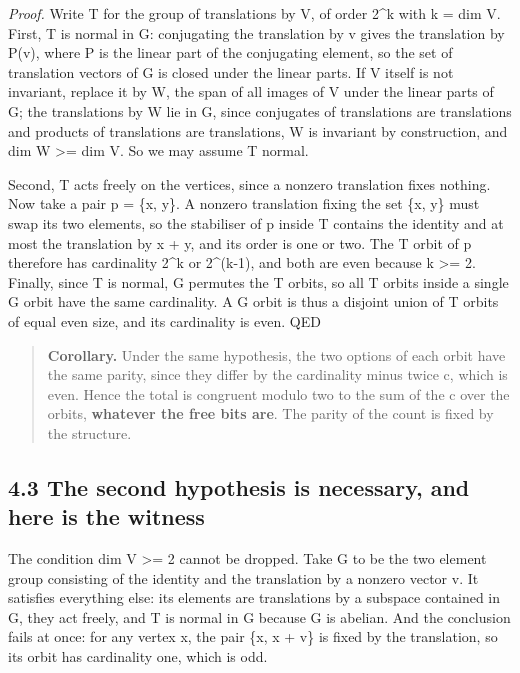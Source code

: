 \documentclass[11pt,a4paper]{article}
\begin{document}
\emph{Proof.} Write T for the group of translations by V, of order 2\textasciicircum{}k with k = dim V. First, T is normal in G: conjugating the translation by v gives the translation by P(v), where P is the linear part of the conjugating element, so the set of translation vectors of G is closed under the linear parts. If V itself is not invariant, replace it by W, the span of all images of V under the linear parts of G; the translations by W lie in G, since conjugates of translations are translations and products of translations are translations, W is invariant by construction, and dim W >= dim V. So we may assume T normal.

Second, T acts freely on the vertices, since a nonzero translation fixes nothing. Now take a pair p = \{x, y\}. A nonzero translation fixing the set \{x, y\} must swap its two elements, so the stabiliser of p inside T contains the identity and at most the translation by x + y, and its order is one or two. The T orbit of p therefore has cardinality 2\textasciicircum{}k or 2\textasciicircum{}(k-1), and both are even because k >= 2. Finally, since T is normal, G permutes the T orbits, so all T orbits inside a single G orbit have the same cardinality. A G orbit is thus a disjoint union of T orbits of equal even size, and its cardinality is even. QED

\begin{quote}
\textbf{Corollary.} Under the same hypothesis, the two options of each orbit have the same parity, since they differ by the cardinality minus twice c, which is even. Hence the total is congruent modulo two to the sum of the c over the orbits, \textbf{whatever the free bits are}. The parity of the count is fixed by the structure.
\end{quote}

\subsection*{4.3 The second hypothesis is necessary, and here is the witness}

The condition dim V >= 2 cannot be dropped. Take G to be the two element group consisting of the identity and the translation by a nonzero vector v. It satisfies everything else: its elements are translations by a subspace contained in G, they act freely, and T is normal in G because G is abelian. And the conclusion fails at once: for any vertex x, the pair \{x, x + v\} is fixed by the translation, so its orbit has cardinality one, which is odd.
\end{document}
